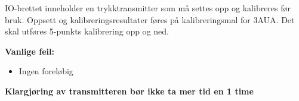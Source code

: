 \vskip 5pt

IO-brettet inneholder en trykktransmitter som må settes opp og kalibreres før bruk. Oppsett og kalibreringsresultater føres på kalibreringsmal for 3AUA. Det skal utføres 5-punkts kalibrering opp og ned. 



\filbreak


\vskip 10pt


\vskip 10pt

\textbf{Vanlige feil:}
\begin{itemize}[noitemsep]
	\item Ingen foreløbig
\end{itemize}


\vskip 10pt

\textbf{Klargjøring av transmitteren bør ikke ta mer tid en 1 time}




\vfil \eject




































\vfil \eject

\noindent

\vskip 20pt




